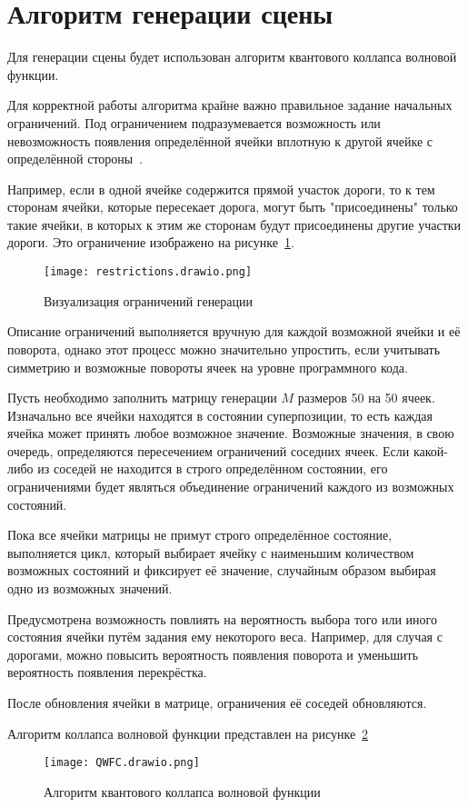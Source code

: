\section{Алгоритм генерации сцены}

Для генерации сцены будет использован алгоритм квантового коллапса волновой функции. 

Для корректной работы алгоритма крайне важно правильное задание начальных ограничений. Под ограничением подразумевается возможность или невозможность появления определённой ячейки вплотную к другой ячейке с определённой стороны~\cite{QWFC}.

Например, если в одной ячейке содержится прямой участок дороги, то к тем сторонам ячейки, которые пересекает дорога, могут быть "присоединены" только такие ячейки, в которых к этим же сторонам будут присоединены другие участки дороги. Это ограничение изображено на рисунке~\ref{fig:restrictions}.

\begin{figure}[h!]
    \centering
    \texttt{[image: restrictions.drawio.png]}
    \caption{Визуализация ограничений генерации}
    \label{fig:restrictions}
\end{figure}

Описание ограничений выполняется вручную для каждой возможной ячейки и её поворота, однако этот процесс можно значительно упростить, если учитывать симметрию и возможные повороты ячеек на уровне программного кода. 

Пусть необходимо заполнить матрицу генерации $M$ размеров 50 на 50 ячеек. Изначально все ячейки находятся в состоянии суперпозиции, то есть каждая ячейка может принять любое возможное значение. Возможные значения, в свою очередь, определяются пересечением ограничений соседних ячеек. Если какой-либо из соседей не находится в строго определённом состоянии, его ограничениями будет являться объединение ограничений каждого из возможных состояний.

Пока все ячейки матрицы не примут строго определённое состояние, выполняется цикл, который выбирает ячейку с наименьшим количеством возможных состояний и фиксирует её значение, случайным образом выбирая одно из возможных значений.

Предусмотрена возможность повлиять на вероятность выбора того или иного состояния ячейки путём задания ему некоторого веса. Например, для случая с дорогами, можно повысить вероятность появления поворота и уменьшить вероятность появления перекрёстка.

После обновления ячейки в матрице, ограничения её соседей обновляются.

Алгоритм коллапса волновой функции представлен на рисунке~\ref{fig:QWFC}

\begin{figure}[h!]
    \centering
    \texttt{[image: QWFC.drawio.png]}
    \caption{Алгоритм квантового коллапса волновой функции}
    \label{fig:QWFC}
\end{figure}

